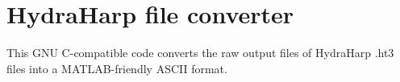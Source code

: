 \chapter{HydraHarp file converter}
\label{appendix:ht3read}
This GNU C-compatible code converts the raw output files of HydraHarp .ht3 files into a MATLAB-friendly ASCII format.

{
  \scriptsize \tt
  
}
